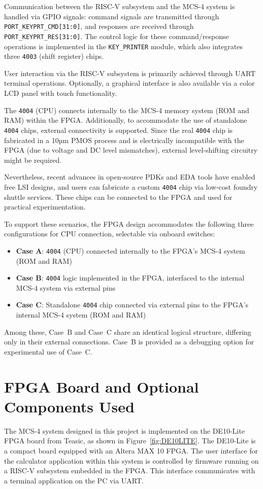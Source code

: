 Communication between the RISC-V subsystem and the MCS-4 system is handled via GPIO signals: command signals are transmitted through \texttt{PORT\_KEYPRT\_CMD[31:0]}, and responses are received through \texttt{PORT\_KEYPRT\_RES[31:0]}. The control logic for these command/response operations is implemented in the \texttt{KEY\_PRINTER} module, which also integrates three \texttt{4003} (shift register) chips.

User interaction via the RISC-V subsystem is primarily achieved through UART terminal operations. Optionally, a graphical interface is also available via a color LCD panel with touch functionality.

The \texttt{4004} (CPU) connects internally to the MCS-4 memory system (ROM and RAM) within the FPGA. Additionally, to accommodate the use of standalone \texttt{4004} chips, external connectivity is supported. Since the real \texttt{4004} chip is fabricated in a 10µm PMOS process and is electrically incompatible with the FPGA (due to voltage and DC level mismatches), external level-shifting circuitry might be required.

Nevertheless, recent advances in open-source PDKs and EDA tools have enabled free LSI designs, and users can fabricate a custom \texttt{4004} chip via low-cost foundry shuttle services. These chips can be connected to the FPGA and used for practical experimentation.

To support these scenarios, the FPGA design accommodates the following three configurations for CPU connection, selectable via onboard switches:

\begin{itemize}
  \item \textbf{Case A}: \texttt{4004} (CPU) connected internally to the FPGA's MCS-4 system (ROM and RAM)
  \item \textbf{Case B}: \texttt{4004} logic implemented in the FPGA, interfaced to the internal MCS-4 system via external pins
  \item \textbf{Case C}: Standalone \texttt{4004} chip connected via external pins to the FPGA's internal MCS-4 system (ROM and RAM)
\end{itemize}

Among these, Case~B and Case~C share an identical logical structure, differing only in their external connections. Case~B is provided as a debugging option for experimental use of Case~C.

\section{FPGA Board and Optional Components Used}
The MCS-4 system designed in this project is implemented on the DE10-Lite FPGA board from Teasic, as shown in Figure~\ref{fig:DE10LITE}. The DE10-Lite is a compact board equipped with an Altera MAX 10 FPGA. The user interface for the calculator application within this system is controlled by firmware running on a RISC-V subsystem embedded in the FPGA. This interface communicates with a terminal application on the PC via UART.\\


